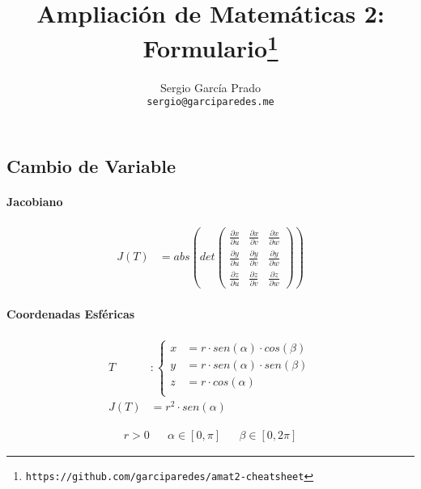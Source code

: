 \documentclass{article}
\title{\vspace{-2em}Ampliación de Matemáticas 2: Formulario\footnote{\texttt{https://github.com/garciparedes/amat2-cheatsheet}}}
\author{Sergio García Prado \\ \texttt{sergio@garciparedes.me}}
\begin{document}

  \maketitle

  \begin{multicols}{2}


    \section{Cambio de Variable}

      \paragraph{Jacobiano}

      \begin{align*}
        J(T) &= abs\left(det\left(
          \begin{array}{ccc}
            \frac{\partial x}{\partial u} & \frac{\partial x}{\partial v} & \frac{\partial x}{\partial w} \\
            \frac{\partial y}{\partial u} & \frac{\partial y}{\partial v} & \frac{\partial y}{\partial w} \\
            \frac{\partial z}{\partial u} & \frac{\partial z}{\partial v} & \frac{\partial z}{\partial w}
          \end{array}
        \right)\right)
      \end{align*}

      \paragraph{Coordenadas Esféricas}

        \begin{align*}
          T &:
          \begin{cases}
            x &= r \cdot sen(\alpha) \cdot cos(\beta) \\
            y &= r \cdot sen(\alpha) \cdot sen(\beta) \\
            z &= r \cdot cos(\alpha) \\
          \end{cases} \\
          J(T) &= r ^ 2 \cdot sen(\alpha)
        \end{align*}

        \begin{align*}
          r > 0 && \alpha \in[0,\pi]&& \beta \in [0,2\pi]
        \end{align*}


\end{multicols}
\end{document}
